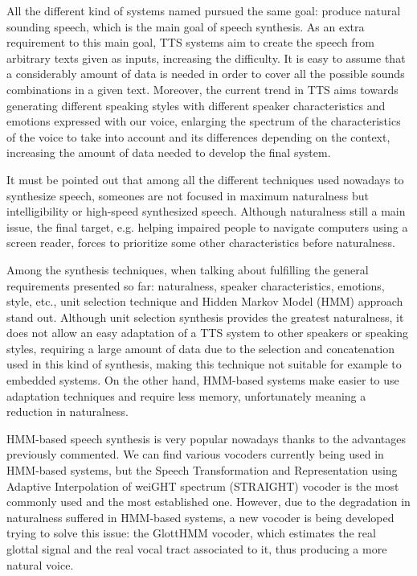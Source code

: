 All the different kind of systems named pursued the same goal: produce natural sounding speech, which is the main goal of speech synthesis. As an extra requirement to this main goal, TTS systems aim to create the speech from arbitrary texts given as inputs, increasing the difficulty. It is easy to assume that a considerably amount of data is needed in order to cover all the possible sounds combinations in a given text. Moreover, the current trend in TTS aims towards generating different speaking styles with different speaker characteristics and emotions expressed with our voice, enlarging the spectrum of the characteristics of the voice to take into account and its differences depending on the context, increasing the amount of data needed to develop the final system. 

It must be pointed out that among all the different techniques used nowadays to synthesize speech, someones are not focused in maximum naturalness but intelligibility or high-speed synthesized speech. Although naturalness still a main issue, the final target, e.g. helping impaired people to navigate computers using a screen reader, forces to prioritize some other characteristics before naturalness. 

Among the synthesis techniques, when talking about fulfilling the general requirements presented so far: naturalness, speaker characteristics, emotions, style, etc., unit selection technique and Hidden Markov Model (HMM) approach stand out. Although unit selection synthesis provides the greatest naturalness, it does not allow an easy adaptation of a TTS system to other speakers or speaking styles, requiring a large amount of data due to the selection and concatenation used in this kind of synthesis, making this technique not suitable for example to embedded systems. On the other hand, HMM-based systems make easier to use adaptation techniques and require less memory, unfortunately meaning a reduction in naturalness.

HMM-based speech synthesis is very popular nowadays thanks to the advantages previously commented. We can find various vocoders currently being used in HMM-based systems, but the Speech Transformation and Representation using Adaptive Interpolation of weiGHT spectrum (STRAIGHT) vocoder is the most commonly used and the most established one. However, due to the degradation in naturalness suffered in HMM-based systems, a new vocoder is being developed trying to solve this issue: the GlottHMM vocoder, which estimates the real glottal signal and the real vocal tract associated to it, thus producing a more natural voice. 

